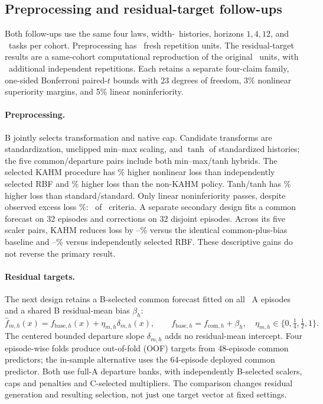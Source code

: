 \subsection{Preprocessing and residual-target follow-ups}
\label{sec:followup-experiments}

Both follow-ups use the same four laws, width-\PPHistory\ histories,
horizons $1,4,12$, and \PPTasks\ tasks per cohort. Preprocessing has
\PPRepetitions\ fresh repetition units. The residual-target results
are a same-cohort computational reproduction of the original
\CFRRepetitions\ units, with \CFRAdditionalRepetitions\ additional
independent repetitions. Each retains a separate four-claim family,
one-sided Bonferroni paired-$t$ bounds with 23 degrees of freedom,
3\% nonlinear superiority margins, and 5\% linear noninferiority.

\paragraph{Preprocessing.}
B jointly selects transformation and native cap. Candidate transforms
are standardization, unclipped min--max scaling, and $\tanh$ of
standardized histories; the five common/departure pairs include both
min--max/tanh hybrids. The selected KAHM procedure has
\PPRBFPenalty\% higher nonlinear loss than independently selected RBF
and \PPPolicyPenalty\% higher loss than the non-KAHM policy.
Tanh/tanh has \PPTanhPenalty\% higher loss than standard/standard.
Only linear noninferiority passes, despite observed excess loss
\PPLinearPenalty\%: \PPPrimaryEstablished\ of \PPPrimaryCount\ criteria.
A separate secondary design fits a common forecast on 32 episodes and
corrections on 32 disjoint episodes. Across its five scaler pairs,
KAHM reduces loss by \PPFixedBiasGainMin--\PPFixedBiasGainMax\% versus
the identical common-plus-bias baseline and
\PPFixedRBFGainMin--\PPFixedRBFGainMax\% versus independently selected
RBF. These descriptive gains do not reverse the primary result.

\paragraph{Residual targets.}
The next design retains a B-selected common forecast fitted on all
\CFREpisodesA\ A episodes and a shared B residual-mean bias $\beta_h$:
\begin{equation}
 \widehat f_{m,h}(x)=f_{\mathrm{base},h}(x)+\eta_{m,h}\delta_{m,h}(x),
 \qquad f_{\mathrm{base},h}=f_{\mathrm{com},h}+\beta_h,
 \quad\eta_{m,h}\in\{0,\tfrac14,\tfrac12,1\}.
 \label{eq:followup-fixed-common}
\end{equation}
The centered bounded departure slope $\delta_{m,h}$ adds no residual-mean
intercept. Four episode-wise folds produce out-of-fold (OOF) targets
from 48-episode common predictors; the in-sample alternative uses the
64-episode deployed common predictor. Both use full-A departure banks,
with independently B-selected scalers, caps and penalties and C-selected
multipliers. The comparison changes residual generation and resulting
selection, not just one target vector at fixed settings.

